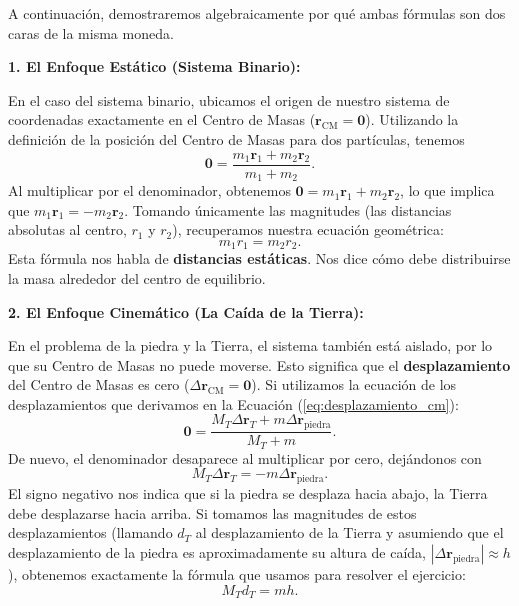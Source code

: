 \documentclass[11pt,a4paper]{book}
\begin{document}
A continuación, demostraremos algebraicamente por qué ambas fórmulas son dos caras de la misma moneda.

\textbf{1. El Enfoque Estático (Sistema Binario):} 

En el caso del sistema binario, ubicamos el origen de nuestro sistema de coordenadas exactamente en el Centro de Masas ($\boldsymbol{r}_{\text{CM}} = \boldsymbol{0}$). 
Utilizando la definición de la posición del Centro de Masas para dos partículas, tenemos
\begin{equation}
    \boldsymbol{0} = \frac{m_1\boldsymbol{r}_1 + m_2\boldsymbol{r}_2}{m_1 + m_2}.
\end{equation}
Al multiplicar por el denominador, obtenemos $\boldsymbol{0} = m_1\boldsymbol{r}_1 + m_2\boldsymbol{r}_2$, lo que implica que $m_1\boldsymbol{r}_1 = -m_2\boldsymbol{r}_2$. Tomando únicamente las magnitudes (las distancias absolutas al centro, $r_1$ y $r_2$), recuperamos nuestra ecuación geométrica:
\begin{equation}
    m_1 r_1 = m_2 r_2.
\end{equation}
Esta fórmula nos habla de \textbf{distancias estáticas}. Nos dice cómo debe distribuirse la masa alrededor del centro de equilibrio.

\textbf{2. El Enfoque Cinemático (La Caída de la Tierra):}

En el problema de la piedra y la Tierra, el sistema también está aislado, por lo que su Centro de Masas no puede moverse. Esto significa que el \textbf{desplazamiento} del Centro de Masas es cero ($\Delta\boldsymbol{r}_{\text{CM}} = \boldsymbol{0}$). 
Si utilizamos la ecuación de los desplazamientos que derivamos en la Ecuación (\ref{eq:desplazamiento_cm}):
\begin{equation}
    \boldsymbol{0} = \frac{M_T \Delta\boldsymbol{r}_T + m \Delta\boldsymbol{r}_{\text{piedra}}}{M_T + m}.
\end{equation}
De nuevo, el denominador desaparece al multiplicar por cero, dejándonos con
\begin{equation}
    M_T \Delta\boldsymbol{r}_T = - m \Delta\boldsymbol{r}_{\text{piedra}}.
\end{equation}
El signo negativo nos indica que si la piedra se desplaza hacia abajo, la Tierra debe desplazarse hacia arriba. Si tomamos las magnitudes de estos desplazamientos (llamando $d_T$ al desplazamiento de la Tierra y asumiendo que el desplazamiento de la piedra es aproximadamente su altura de caída, $|\Delta\boldsymbol{r}_{\text{piedra}}| \approx h$), obtenemos exactamente la fórmula que usamos para resolver el ejercicio:
\begin{equation}
    M_T d_T = m h.
\end{equation}
\end{document}
